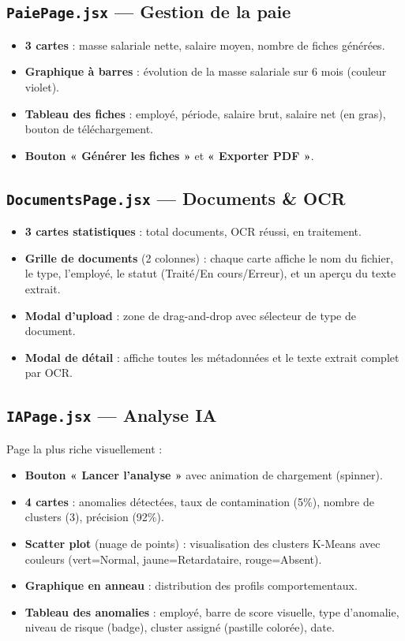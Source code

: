 \documentclass[a4paper,12pt]{report}
\begin{document}
\subsection{\texttt{PaiePage.jsx} --- Gestion de la paie}
\begin{itemize}
  \item \textbf{3 cartes} : masse salariale nette, salaire moyen, nombre de fiches générées.
  \item \textbf{Graphique à barres} : évolution de la masse salariale sur 6 mois (couleur violet).
  \item \textbf{Tableau des fiches} : employé, période, salaire brut, salaire net (en gras), bouton de téléchargement.
  \item \textbf{Bouton « Générer les fiches »} et \textbf{« Exporter PDF »}.
\end{itemize}

\subsection{\texttt{DocumentsPage.jsx} --- Documents \& OCR}
\begin{itemize}
  \item \textbf{3 cartes statistiques} : total documents, OCR réussi, en traitement.
  \item \textbf{Grille de documents} (2 colonnes) : chaque carte affiche le nom du fichier, le type, l'employé, le statut (Traité/En cours/Erreur), et un aperçu du texte extrait.
  \item \textbf{Modal d'upload} : zone de drag-and-drop avec sélecteur de type de document.
  \item \textbf{Modal de détail} : affiche toutes les métadonnées et le texte extrait complet par OCR.
\end{itemize}

\subsection{\texttt{IAPage.jsx} --- Analyse IA}
Page la plus riche visuellement :
\begin{itemize}
  \item \textbf{Bouton « Lancer l'analyse »} avec animation de chargement (spinner).
  \item \textbf{4 cartes} : anomalies détectées, taux de contamination (5\%), nombre de clusters (3), précision (92\%).
  \item \textbf{Scatter plot} (nuage de points) : visualisation des clusters K-Means avec couleurs (vert=Normal, jaune=Retardataire, rouge=Absent).
  \item \textbf{Graphique en anneau} : distribution des profils comportementaux.
  \item \textbf{Tableau des anomalies} : employé, barre de score visuelle, type d'anomalie, niveau de risque (badge), cluster assigné (pastille colorée), date.
\end{itemize}
\end{document}

